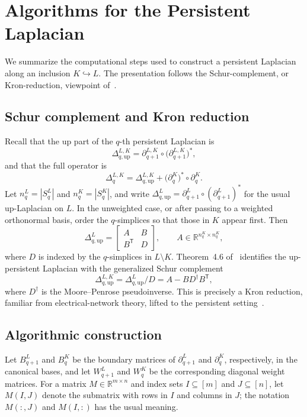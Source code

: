 \documentclass{article}
\newcommand{\R}{\mathbb{R}}
\begin{document}
\section{Algorithms for the Persistent Laplacian}
\label{app:pl-algorithms}

We summarize the computational steps used to construct a persistent Laplacian along an inclusion $K\hookrightarrow L$. The presentation follows the Schur-complement, or Kron-reduction, viewpoint of~\cite{memoli2022persistent}.

\subsection{Schur complement and Kron reduction}

Recall that the up part of the $q$-th persistent Laplacian is
\[
\Delta^{L,K}_{q,\mathrm{up}}
  = \partial^{L,K}_{q+1}\circ
    \bigl(\partial^{L,K}_{q+1}\bigr)^{*},
\]
and that the full operator is
\[
\Delta^{L,K}_{q}
  = \Delta^{L,K}_{q,\mathrm{up}}
    + \bigl(\partial_q^K\bigr)^{*}\circ\partial_q^K.
\]
Let $n_q^L=|S_q^L|$ and $n_q^K=|S_q^K|$, and write
$\Delta^L_{q,\mathrm{up}}=\partial^L_{q+1}\circ
(\partial^L_{q+1})^*$ for the usual up-Laplacian on $L$.
In the unweighted case, or after passing to a weighted orthonormal basis, order the
$q$-simplices so that those in $K$ appear first. Then
\[
\Delta^L_{q,\mathrm{up}}
=
\begin{bmatrix}
A & B\\
B^{\mathsf T} & D
\end{bmatrix},
\qquad
A\in\R^{n_q^K\times n_q^K},
\]
where $D$ is indexed by the $q$-simplices in $L\setminus K$.
Theorem~4.6 of~\cite{memoli2022persistent} identifies the up-persistent
Laplacian with the generalized Schur complement
\[
\Delta^{L,K}_{q,\mathrm{up}}
  = \Delta^L_{q,\mathrm{up}}/D
  = A-BD^{\dagger}B^{\mathsf T},
\]
where $D^{\dagger}$ is the Moore--Penrose pseudoinverse. This is precisely a
Kron reduction, familiar from electrical-network theory, lifted to the
persistent setting~\cite{dorfler2012kron,kron1939tensor}.

\subsection{Algorithmic construction}

Let $B^L_{q+1}$ and $B^K_q$ be the boundary matrices of
$\partial^L_{q+1}$ and $\partial^K_q$, respectively, in the canonical bases,
and let $W^L_{q+1}$ and $W^K_q$ be the corresponding diagonal weight matrices.
For a matrix $M\in\R^{m\times n}$ and index sets $I\subseteq[m]$ and
$J\subseteq[n]$, let $M(I,J)$ denote the submatrix with rows in $I$ and
columns in $J$; the notation $M(:,J)$ and $M(I,:)$ has the usual meaning.
\end{document}
